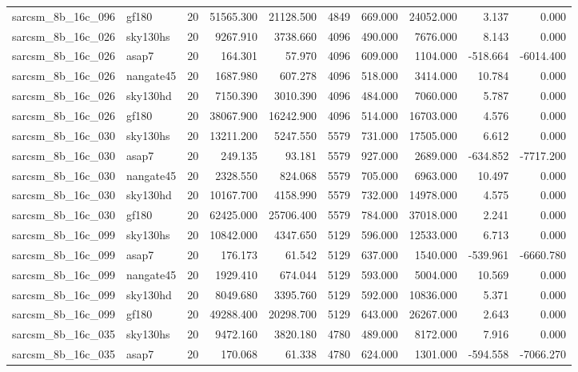 \documentclass{article}
\begin{document}
\begin{longtable}{llrrrrrrrr}
sarcsm\_8b\_16c\_096 & gf180 & 20 & 51565.300 & 21128.500 & 4849 & 669.000 & 24052.000 & 3.137 & 0.000 \\
sarcsm\_8b\_16c\_026 & sky130hs & 20 & 9267.910 & 3738.660 & 4096 & 490.000 & 7676.000 & 8.143 & 0.000 \\
sarcsm\_8b\_16c\_026 & asap7 & 20 & 164.301 & 57.970 & 4096 & 609.000 & 1104.000 & -518.664 & -6014.400 \\
sarcsm\_8b\_16c\_026 & nangate45 & 20 & 1687.980 & 607.278 & 4096 & 518.000 & 3414.000 & 10.784 & 0.000 \\
sarcsm\_8b\_16c\_026 & sky130hd & 20 & 7150.390 & 3010.390 & 4096 & 484.000 & 7060.000 & 5.787 & 0.000 \\
sarcsm\_8b\_16c\_026 & gf180 & 20 & 38067.900 & 16242.900 & 4096 & 514.000 & 16703.000 & 4.576 & 0.000 \\
sarcsm\_8b\_16c\_030 & sky130hs & 20 & 13211.200 & 5247.550 & 5579 & 731.000 & 17505.000 & 6.612 & 0.000 \\
sarcsm\_8b\_16c\_030 & asap7 & 20 & 249.135 & 93.181 & 5579 & 927.000 & 2689.000 & -634.852 & -7717.200 \\
sarcsm\_8b\_16c\_030 & nangate45 & 20 & 2328.550 & 824.068 & 5579 & 705.000 & 6963.000 & 10.497 & 0.000 \\
sarcsm\_8b\_16c\_030 & sky130hd & 20 & 10167.700 & 4158.990 & 5579 & 732.000 & 14978.000 & 4.575 & 0.000 \\
sarcsm\_8b\_16c\_030 & gf180 & 20 & 62425.000 & 25706.400 & 5579 & 784.000 & 37018.000 & 2.241 & 0.000 \\
sarcsm\_8b\_16c\_099 & sky130hs & 20 & 10842.000 & 4347.650 & 5129 & 596.000 & 12533.000 & 6.713 & 0.000 \\
sarcsm\_8b\_16c\_099 & asap7 & 20 & 176.173 & 61.542 & 5129 & 637.000 & 1540.000 & -539.961 & -6660.780 \\
sarcsm\_8b\_16c\_099 & nangate45 & 20 & 1929.410 & 674.044 & 5129 & 593.000 & 5004.000 & 10.569 & 0.000 \\
sarcsm\_8b\_16c\_099 & sky130hd & 20 & 8049.680 & 3395.760 & 5129 & 592.000 & 10836.000 & 5.371 & 0.000 \\
sarcsm\_8b\_16c\_099 & gf180 & 20 & 49288.400 & 20298.700 & 5129 & 643.000 & 26267.000 & 2.643 & 0.000 \\
sarcsm\_8b\_16c\_035 & sky130hs & 20 & 9472.160 & 3820.180 & 4780 & 489.000 & 8172.000 & 7.916 & 0.000 \\
sarcsm\_8b\_16c\_035 & asap7 & 20 & 170.068 & 61.338 & 4780 & 624.000 & 1301.000 & -594.558 & -7066.270 \\

\end{longtable}
\end{document}
